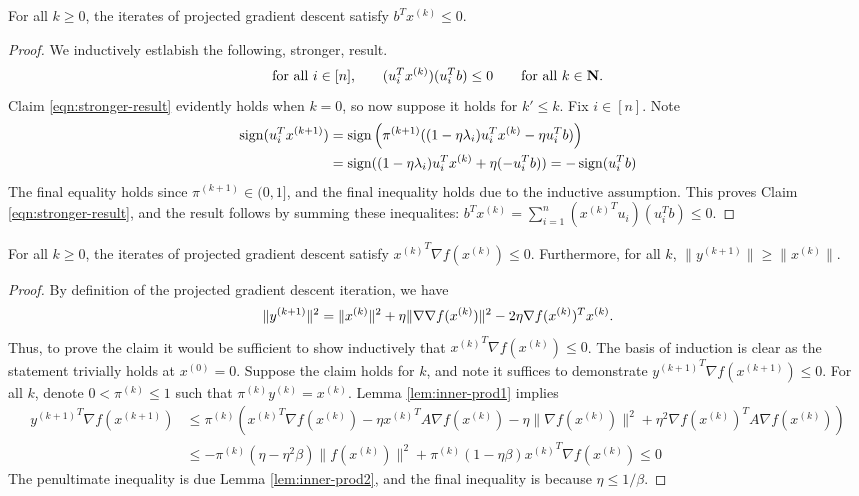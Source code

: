 \documentclass[11pt]{article}
\begin{document}
\begin{lem}\label{lem:inner-prod1}
  For all $k \geq 0$, the iterates of projected gradient descent satisfy $b^Tx^{(k)} \leq 0$. 
\end{lem}
\begin{proof}
  We inductively estlabish the following, stronger, result.  
  \begin{equation}\label{eqn:stronger-result}
  \text{for all $i \in [n]$,} \qquad  (u_i^Tx^{(k)})(u_i^T b) \leq 0 \qquad \text{for all $k \in \mathbf{N}$.}
  \end{equation}
  Claim \eqref{eqn:stronger-result} evidently holds when $k = 0$, so now suppose it holds for $k' \leq k$. Fix $i \in [n]$.
  Note
  \begin{align*}
    \operatorname{sign}(u_i^Tx^{(k + 1)}) &= \operatorname{sign}\left(\pi^{(k + 1)}((1 - \eta \lambda_i) u_i^Tx^{(k)} - \eta u_i^T b)\right) \\
                                   &= \operatorname{sign}((1 - \eta \lambda_i) u_i^Tx^{(k)} + \eta (-u_i^T b)) = -\operatorname{sign}(u_i^Tb)
  \end{align*}
  The final equality holds since $\pi^{(k + 1)} \in (0, 1]$, and the final inequality holds due to the inductive assumption. This proves
    Claim \eqref{eqn:stronger-result}, and the result follows by summing these inequalites:
    $b^Tx^{(k)} = \sum_{i=1}^n ({x^{(k)}}^Tu_i)(u_i^T b) \leq 0$.
\end{proof}
\begin{lem}\label{lem:inner-prod3}
  For all $k \geq 0$, the iterates of projected gradient descent satisfy ${x^{(k)}}^T\nabla f(x^{(k)}) \leq 0$. Furthermore,
  for all $k$, $\|y^{(k + 1)}\| \geq \|x^{(k)}\|$. 
\end{lem}
\begin{proof}
  By definition of the projected gradient descent iteration, we have
  \[
  \|y^{(k + 1)}\|^2 = \|x^{(k)}\|^2 + \eta \|\nabla {\nabla} f(x^{(k)})\|^2 - 2 \eta {\nabla} f(x^{(k)})^T x^{(k)}.
  \]
  Thus, to prove the claim it would be sufficient to show inductively that ${x^{(k)}}^T\nabla f(x^{(k)}) \leq 0$. 
  The basis of induction is clear as the statement trivially holds at $x^{(0)} = 0$.
  Suppose the claim holds for $k$, and note it suffices
  to demonstrate ${y^{(k + 1)}}^T \nabla f(x^{(k + 1)}) \leq 0$. 
  For all $k$, denote $0 < \pi^{(k)} \leq 1$ such that $\pi^{(k)} y^{(k)} = x^{(k)}$. Lemma \ref{lem:inner-prod1} implies
  \begin{align*}
    {y^{(k + 1)}}^T\nabla f(x^{(k+1)}) &\leq 
    \pi^{(k)} \left({x^{(k)}}^T\nabla f(x^{(k)}) - \eta {x^{(k)}}^T A \nabla f(x^{(k)}) - \eta \|\nabla f(x^{(k)})\|^2
    + \eta^2 \nabla f(x^{(k)})^T A \nabla f(x^{(k)}) \right) \\
    &\leq -\pi^{(k)} (\eta-\eta^2 \beta) \|f(x^{(k)})\|^2  + \pi^{(k)}(1 - \eta \beta) {x^{(k)}}^T\nabla f(x^{(k)}) \leq 0 
  \end{align*}
  The penultimate inequality is due Lemma \ref{lem:inner-prod2}, and the final inequality is because $\eta \leq 1/\beta$.
\end{proof}
\end{document}
